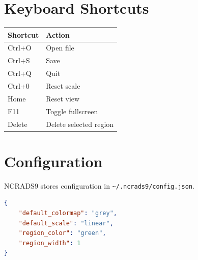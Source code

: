 \documentclass[11pt,a4paper]{report}
\begin{document}

\appendix

\chapter{Keyboard Shortcuts}

\begin{longtable}{ll}
\toprule
\textbf{Shortcut} & \textbf{Action} \\
\midrule
\endhead
Ctrl+O & Open file \\
Ctrl+S & Save \\
Ctrl+Q & Quit \\
Ctrl+0 & Reset scale \\
Home & Reset view \\
F11 & Toggle fullscreen \\
Delete & Delete selected region \\
\bottomrule
\end{longtable}

\chapter{Configuration}

NCRADS9 stores configuration in \texttt{\~{}/.ncrads9/config.json}.

\begin{lstlisting}[language=json]
{
    "default_colormap": "grey",
    "default_scale": "linear",
    "region_color": "green",
    "region_width": 1
}
\end{lstlisting}
\end{document}
